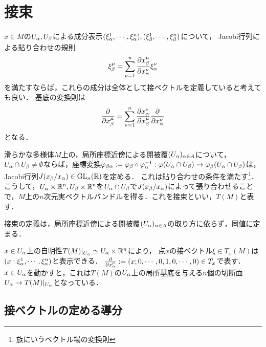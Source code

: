 \documentclass[uplatex,dvipdfmx]{jsreport}
\begin{document}
\section{接束}

\begin{tcolorbox}[colframe=ForestGreen, colback=ForestGreen!10!white,breakable,colbacktitle=ForestGreen!40!white,coltitle=black,fonttitle=\bfseries\sffamily,
title=]
    $x\in M$の$U_\alpha,U_\beta$による成分表示$(\xi_\alpha^1,\cdots,\xi_\alpha^n),(\xi_\beta^1,\cdots,\xi_\beta^n)$について，
    Jacobi行列による貼り合わせの規則
    \[\xi_\beta^\mu=\sum^n_{\nu=1}\frac{\partial x_\beta^\mu}{\partial x_\alpha^\nu}\xi_\alpha^\nu\]
    を満たすならば，これらの成分は全体として接ベクトルを定義していると考えても良い．
    基底の変換則は
    \[\frac{\partial }{\partial x_\beta^\mu}=\sum^n_{\nu=1}\frac{\partial x_\alpha^\nu}{\partial x_\beta^\mu}\frac{\partial }{\partial x_\alpha^\nu}\]
    となる．
\end{tcolorbox}

\begin{definition}
    滑らかな多様体$M$上の，局所座標近傍による開被覆$(U_\alpha)_{\alpha\in A}$について，
    $U_\alpha\cap U_\beta\ne\emptyset$ならば，座標変換$\varphi_{\beta\alpha}:=\varphi_\beta\circ\varphi_\alpha^{-1}:\varphi(U_\alpha\cap U_\beta)\to\varphi_\beta(U_\alpha\cap U_\beta)$は，Jacobi行列$J(x_\beta/x_\alpha)\in\mathrm{GL}_n(\mathbb{R})$を定める．
    これは貼り合わせの条件を満たす\footnote{族にいうベクトル場の変換則}．
    こうして，$U_\alpha\times\mathbb{R}^n,U_\beta\times\mathbb{R}^n$を$U_\alpha\cap U_\beta$で$J(x_\beta/x_\alpha)$によって張り合わせることで，$M$上の$n$次元実ベクトルバンドルを得る．これを接束といい，$T(M)$と表す．
\end{definition}

\begin{lemma}
    接束の定義は，局所座標近傍による開被覆$(U_\alpha)_{\alpha\in A}$の取り方に依らず，同値に定まる．
\end{lemma}

\begin{remarks}
    $x\in U_\alpha$上の自明性$T(M)|_{U_\alpha}\simeq U_\alpha\times\mathbb{R}^n$により，
    点$x$の接ベクトル$\xi\in T_x(M)$は$(x:\xi^1_\alpha,\cdots,\xi^n_\alpha)$と表示できる．
    $\frac{\partial }{\partial x_\alpha^\mu}:=(x;0,\cdots,0,1,0,\cdots,0)\in T_x$で表す．$x\in U_\alpha$を動かすと，これは$T(M)$の$U_\alpha$上の局所基底を与える$n$個の切断面$U_\alpha\to T(M)|_{U_\alpha}$となっている．
\end{remarks}

\subsection{接ベクトルの定める導分}
\end{document}
